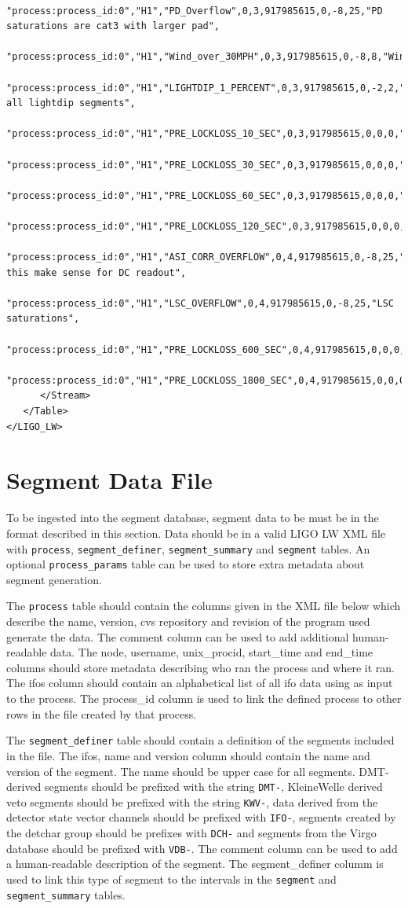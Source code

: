 {\begin{verbatim}
      "process:process_id:0","H1","PD_Overflow",0,3,917985615,0,-8,25,"PD saturations are cat3 with larger pad",
      "process:process_id:0","H1","Wind_over_30MPH",0,3,917985615,0,-8,8,"Windy",
      "process:process_id:0","H1","LIGHTDIP_1_PERCENT",0,3,917985615,0,-2,2,"Exclude all lightdip segments",
      "process:process_id:0","H1","PRE_LOCKLOSS_10_SEC",0,3,917985615,0,0,0,"",
      "process:process_id:0","H1","PRE_LOCKLOSS_30_SEC",0,3,917985615,0,0,0,"",
      "process:process_id:0","H1","PRE_LOCKLOSS_60_SEC",0,3,917985615,0,0,0,"",
      "process:process_id:0","H1","PRE_LOCKLOSS_120_SEC",0,3,917985615,0,0,0,"",
      "process:process_id:0","H1","ASI_CORR_OVERFLOW",0,4,917985615,0,-8,25,"Does this make sense for DC readout",
      "process:process_id:0","H1","LSC_OVERFLOW",0,4,917985615,0,-8,25,"LSC saturations",
      "process:process_id:0","H1","PRE_LOCKLOSS_600_SEC",0,4,917985615,0,0,0,"",
      "process:process_id:0","H1","PRE_LOCKLOSS_1800_SEC",0,4,917985615,0,0,0,""
      </Stream>
   </Table>
</LIGO_LW>
\end{verbatim}
}

\section{Segment Data File}

To be ingested into the segment database, segment data to be must be in the
format described in this section. Data should be in a valid LIGO LW XML file
with \verb|process|, \verb|segment_definer|, \verb|segment_summary| and
\verb|segment| tables. An optional \verb|process_params| table can be used to
store extra metadata about segment generation.

The \verb|process| table should contain the columns given in the XML file
below which describe the name, version, cvs repository and revision of the
program used generate the data. The comment column can be used to add
additional human-readable data. The node, username, unix\_procid, start\_time
and end\_time columns should store metadata describing who ran the process and
where it ran. The ifos column should contain an alphabetical list of all ifo
data using as input to the process. The process\_id column is used to link the
defined process to other rows in the file created by that process.

The \verb|segment_definer| table should contain a definition of the segments
included in the file. The ifos, name and version column should contain the
name and version of the segment. The name should be upper case for all
segments. DMT-derived segments should be prefixed with the string \verb|DMT-|,
KleineWelle derived veto segments should be prefixed with the string
\verb|KWV-|, data derived from the detector state vector channels should be
prefixed with \verb|IFO-|, segments created by the detchar group should be
prefixes with \verb|DCH-| and segments from the Virgo database should be
prefixed with \verb|VDB-|.  The comment column can be used to add a
human-readable description of the segment. The segment\_definer columm is used
to link this type of segment to the intervals in the \verb|segment| and
\verb|segment_summary| tables.

